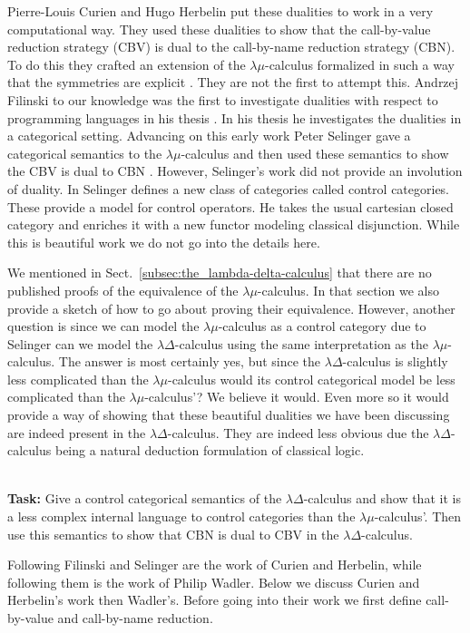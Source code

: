 Pierre-Louis Curien and Hugo Herbelin put these dualities to work in a
very computational way.  They used these dualities to show that the
call-by-value reduction strategy (CBV) is dual to the call-by-name
reduction strategy (CBN).  To do this they crafted an extension of the
$\lambda\mu$-calculus formalized in such a way that the symmetries are
explicit \cite{Curien:2000}.  They are not the first to attempt this.
Andrzej Filinski to our knowledge was the first to investigate
dualities with respect to programming languages in his thesis
\cite{Filinski:1989}.  In his thesis he investigates the dualities in a
categorical setting.  Advancing on this early work Peter Selinger gave
a categorical semantics to the $\lambda\mu$-calculus and then used
these semantics to show the CBV is dual to CBN \cite{Selinger:2001}.
However, Selinger's work did not provide an involution of duality.  In
\cite{Selinger:2001} Selinger defines a new class of categories called
control categories.  These provide a model for control operators.  He
takes the usual cartesian closed category and enriches it with a new
functor modeling classical disjunction.  While this is beautiful work
we do not go into the details here.  

\begin{openproblem}
  We mentioned in Sect.~\ref{subsec:the_lambda-delta-calculus} that
  there are no published proofs of the equivalence of the
  $\lambda\mu$-calculus.  In that section we also provide a sketch of
  how to go about proving their equivalence.  However, another
  question is since we can model the $\lambda\mu$-calculus as a
  control category due to Selinger can we model the
  $\lambda\Delta$-calculus using the same interpretation as the
  $\lambda\mu$-calculus.  The answer is most certainly yes, but since
  the $\lambda\Delta$-calculus is slightly less complicated than the
  $\lambda\mu$-calculus would its control categorical model be less
  complicated than the $\lambda\mu$-calculus'?  We believe it would.
  Even more so it would provide a way of showing that these beautiful
  dualities we have been discussing are indeed present in the
  $\lambda\Delta$-calculus.  They are indeed less obvious due the
  $\lambda\Delta$-calculus being a natural deduction formulation of
  classical logic.

  \ \\
  \noindent
  \textbf{Task:} Give a control categorical semantics of the
  $\lambda\Delta$-calculus and show that it is a less complex internal
  language to control categories than the $\lambda\mu$-calculus'.  Then
  use this semantics to show that CBN is dual to CBV in the
  $\lambda\Delta$-calculus.
\end{openproblem}
\noindent
Following Filinski and Selinger are the work of Curien and Herbelin,
while following them is the work of Philip Wadler.  Below we discuss
Curien and Herbelin's work then Wadler's.  Before going into their work
we first define call-by-value and call-by-name reduction.

